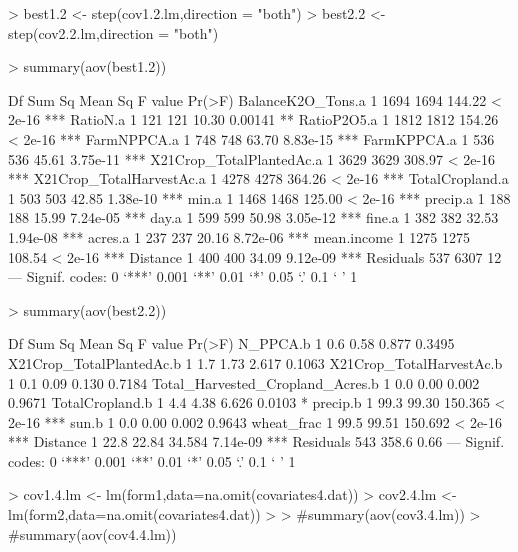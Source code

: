 \documentclass{report}
\begin{document}
\begin{Schunk}
\begin{Sinput}
> best1.2 <- step(cov1.2.lm,direction = "both")
> best2.2 <- step(cov2.2.lm,direction = "both")
\end{Sinput}
\end{Schunk}

\begin{Schunk}
\begin{Sinput}
> summary(aov(best1.2))
\end{Sinput}
\begin{Soutput}
                          Df Sum Sq Mean Sq F value   Pr(>F)    
BalanceK2O_Tons.a          1   1694    1694  144.22  < 2e-16 ***
RatioN.a                   1    121     121   10.30  0.00141 ** 
RatioP2O5.a                1   1812    1812  154.26  < 2e-16 ***
FarmNPPCA.a                1    748     748   63.70 8.83e-15 ***
FarmKPPCA.a                1    536     536   45.61 3.75e-11 ***
X21Crop_TotalPlantedAc.a   1   3629    3629  308.97  < 2e-16 ***
X21Crop_TotalHarvestAc.a   1   4278    4278  364.26  < 2e-16 ***
TotalCropland.a            1    503     503   42.85 1.38e-10 ***
min.a                      1   1468    1468  125.00  < 2e-16 ***
precip.a                   1    188     188   15.99 7.24e-05 ***
day.a                      1    599     599   50.98 3.05e-12 ***
fine.a                     1    382     382   32.53 1.94e-08 ***
acres.a                    1    237     237   20.16 8.72e-06 ***
mean.income                1   1275    1275  108.54  < 2e-16 ***
Distance                   1    400     400   34.09 9.12e-09 ***
Residuals                537   6307      12                     
---
Signif. codes:  0 ‘***’ 0.001 ‘**’ 0.01 ‘*’ 0.05 ‘.’ 0.1 ‘ ’ 1
\end{Soutput}
\begin{Sinput}
> summary(aov(best2.2))
\end{Sinput}
\begin{Soutput}
                                  Df Sum Sq Mean Sq F value   Pr(>F)    
N_PPCA.b                           1    0.6    0.58   0.877   0.3495    
X21Crop_TotalPlantedAc.b           1    1.7    1.73   2.617   0.1063    
X21Crop_TotalHarvestAc.b           1    0.1    0.09   0.130   0.7184    
Total_Harvested_Cropland_Acres.b   1    0.0    0.00   0.002   0.9671    
TotalCropland.b                    1    4.4    4.38   6.626   0.0103 *  
precip.b                           1   99.3   99.30 150.365  < 2e-16 ***
sun.b                              1    0.0    0.00   0.002   0.9643    
wheat_frac                         1   99.5   99.51 150.692  < 2e-16 ***
Distance                           1   22.8   22.84  34.584 7.14e-09 ***
Residuals                        543  358.6    0.66                     
---
Signif. codes:  0 ‘***’ 0.001 ‘**’ 0.01 ‘*’ 0.05 ‘.’ 0.1 ‘ ’ 1
\end{Soutput}
\begin{Sinput}
> cov1.4.lm <- lm(form1,data=na.omit(covariates4.dat))
> cov2.4.lm <- lm(form2,data=na.omit(covariates4.dat))
> 
> #summary(aov(cov3.4.lm))
> #summary(aov(cov4.4.lm))
\end{Sinput}
\end{Schunk}
\end{document}
